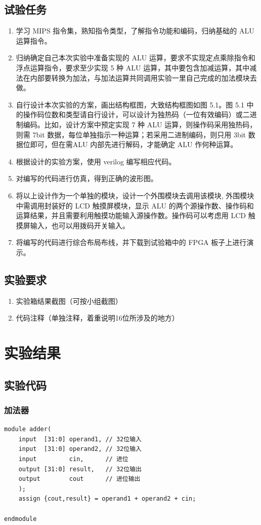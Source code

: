 \documentclass[AutoFakeBold]{LZUThesis}
\begin{document}
\section{试验任务}
\begin{enumerate}
    \item 学习 MIPS 指令集，熟知指令类型，了解指令功能和编码，归纳基础的 ALU 运算指令。
    \item 归纳确定自己本次实验中准备实现的 ALU 运算，要求不实现定点乘除指令和浮点运算指令，要求至少实现 5 种 ALU 运算，其中要包含加减运算，其中减法在内部要转换为加法，与加法运算共同调用实验一里自己完成的加法模块去做。
    \item 自行设计本次实验的方案，画出结构框图，大致结构框图如图 5.1。图 5.1 中的操作码位数和类型请自行设计，可以设计为独热码（一位有效编码）或二进制编码。比如，设计方案中预定实现 7 种 ALU 运算，则操作码采用独热码，则需 7bit 数据，每位单独指示一种运算；若采用二进制编码，则只用 3bit 数据位即可，但在需ALU 内部先进行解码，才能确定 ALU 作何种运算。
    \item 根据设计的实验方案，使用 verilog 编写相应代码。
    \item 对编写的代码进行仿真，得到正确的波形图。
    \item 将以上设计作为一个单独的模块，设计一个外围模块去调用该模块, 外围模块中需调用封装好的 LCD 触摸屏模块，显示 ALU 的两个源操作数、操作码和运算结果，并且需要利用触摸功能输入源操作数。操作码可以考虑用 LCD 触摸屏输入，也可以用拨码开关输入。
    \item 将编写的代码进行综合布局布线，并下载到试验箱中的 FPGA 板子上进行演示。
\end{enumerate}
\section{实验要求}
\begin{enumerate}
    \item 实验箱结果截图（可按小组截图）
    \item 代码注释（单独注释，着重说明16位所涉及的地方）
\end{enumerate}

\chapter{实验结果}
\section{实验代码}
\subsection{加法器}
\begin{lstlisting}[style=verilog-style]
module adder(
    input  [31:0] operand1, // 32位输入
    input  [31:0] operand2, // 32位输入
    input         cin,      // 进位
    output [31:0] result,   // 32位输出
    output        cout      // 进位输出
    );
    assign {cout,result} = operand1 + operand2 + cin;

endmodule
\end{lstlisting}
\end{document}
